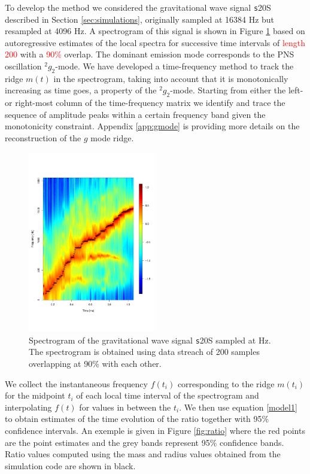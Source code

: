 To develop the method we considered the gravitational wave signal
{\texttt s20S} described in Section \ref{sec:simulations}, originally
sampled at 16384 Hz but resampled at 4096 Hz.
A spectrogram of this signal is shown in Figure \ref{fig:spectrogram} based on
autoregressive estimates of the local spectra for successive time intervals of 
\textcolor{red}{length 200} with a \textcolor{red}{ 90\%} overlap.
The dominant emission mode corresponds to the PNS oscillation $\mbox{}^2 g_2$-mode. We have
developed a time-frequency method to track the ridge $m(t)$ in the spectrogram,
taking into account that it is monotonically increasing as time goes,
a property of the $\mbox{}^2 g_2$-mode.
Starting from either the left- or right-most column of the time-frequency matrix
we identify and trace the sequence of amplitude peaks within a certain frequency
band given the monotonicity constraint. Appendix \ref{app:gmode} is providing more
details on the reconstruction of the $g$ mode ridge. 


\begin{figure}
 \centering
 \includegraphics[width=0.5\textwidth]{plots/spectrogram}
 \caption{Spectrogram of the gravitational wave signal {\texttt s20S} sampled at \unit[4096]{Hz}.
   The spectrogram is obtained using data streach of 200 samples overlapping at 90\%
   with each other.} \label{fig:spectrogram}
\end{figure}


We collect the instantaneous frequency $f(t_i)$ corresponding to the ridge $m(t_i)$ for
the midpoint $t_i$ of each local time interval of the spectrogram and interpolating $f(t)$
for values in between the $t_i$. We then use equation \eqref{model1} to obtain
estimates of the time evolution of the ratio together with 95\% confidence intervals.
An exemple is given in Figure \ref{fig:ratio} where the red points are the point estimates and
the grey bands represent 95\% confidence bands. Ratio values
computed using the mass and radius values obtained from the simulation code are shown in black.

